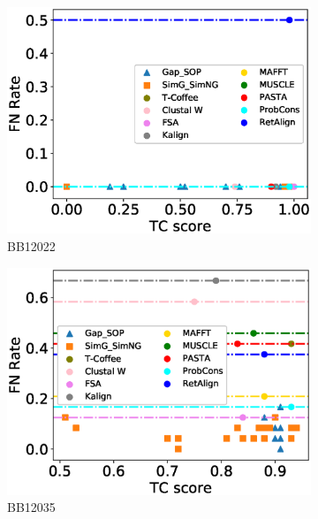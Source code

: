 \begin{figure}[!htbp]
\begin{adjustwidth}{-1.5cm}{-1cm}
\begin{subfigure}{0.22\textwidth}
			\includegraphics[width=\columnwidth]{Figure/summary/precomputedInit/Balibase/BB12022_fnrate_vs_tc_2}
			\caption{BB12022}
		\end{subfigure}
		\begin{subfigure}{0.22\textwidth}
			\includegraphics[width=\columnwidth]{Figure/summary/precomputedInit/Balibase/BB12035_fnrate_vs_tc_2}
			\caption{BB12035}
		\end{subfigure}	
		\begin{subfigure}{0.22\textwidth}

\end{subfigure}
\end{adjustwidth}
\end{figure}
